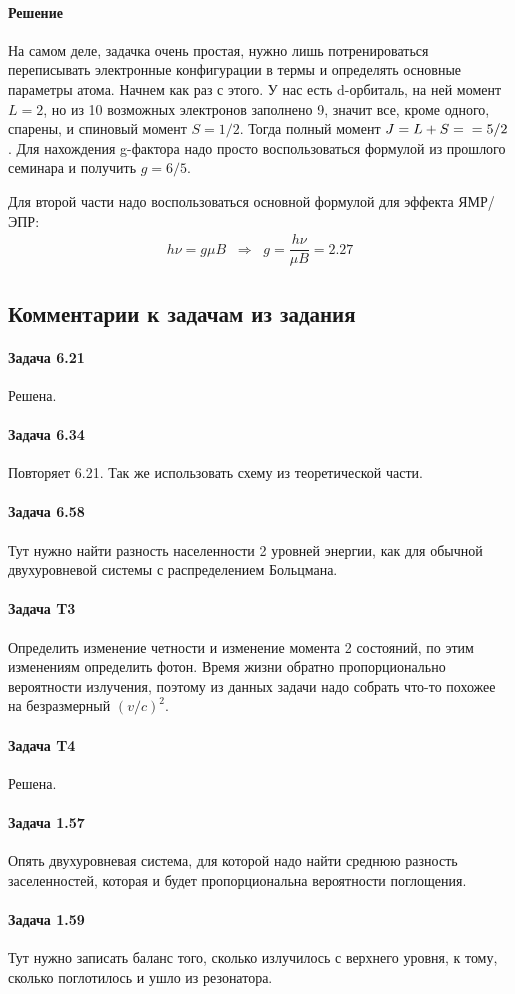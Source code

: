 \documentclass[12pt]{article}
\begin{document}
\paragraph{Решение}
На самом деле, задачка очень простая, нужно лишь потренироваться переписывать электронные конфигурации в термы и определять основные параметры атома. Начнем как раз  с этого. У нас есть d-орбиталь, на ней момент $L=2$, но из 10 возможных электронов заполнено 9, значит все, кроме одного, спарены, и спиновый момент $S=1/2$. Тогда полный момент $J=L+S =\\= 5/2$. Для нахождения g-фактора надо просто воспользоваться формулой из прошлого семинара и получить $g=6/5$.

\vspace{1em} \noindent
Для второй части надо воспользоваться основной формулой для эффекта ЯМР/ЭПР:
\begin{gather*}
    h\nu = g\mu B \;\;\Rightarrow\;\; g = \dfrac{h\nu}{\mu B} = 2.27
\end{gather*}


\subsection{Комментарии к задачам из задания}
\paragraph{Задача 6.21} Решена.
\paragraph{Задача 6.34} Повторяет 6.21. Так же использовать схему из теоретической части.
\paragraph{Задача 6.58} Тут нужно найти разность населенности 2 уровней энергии, как для обычной двухуровневой системы с распределением Больцмана.
\paragraph{Задача T3} Определить изменение четности и изменение момента 2 состояний, по этим изменениям определить фотон. Время жизни обратно пропорционально вероятности излучения, поэтому из данных задачи надо собрать что-то похожее на безразмерный $(v/c)^2$.
\paragraph{Задача T4} Решена.
\paragraph{Задача 1.57} Опять двухуровневая система, для которой надо найти среднюю разность заселенностей, которая и будет пропорциональна вероятности поглощения.
\paragraph{Задача 1.59} Тут нужно записать баланс того, сколько излучилось с верхнего уровня, к тому, сколько поглотилось и ушло из резонатора.
\end{document}

